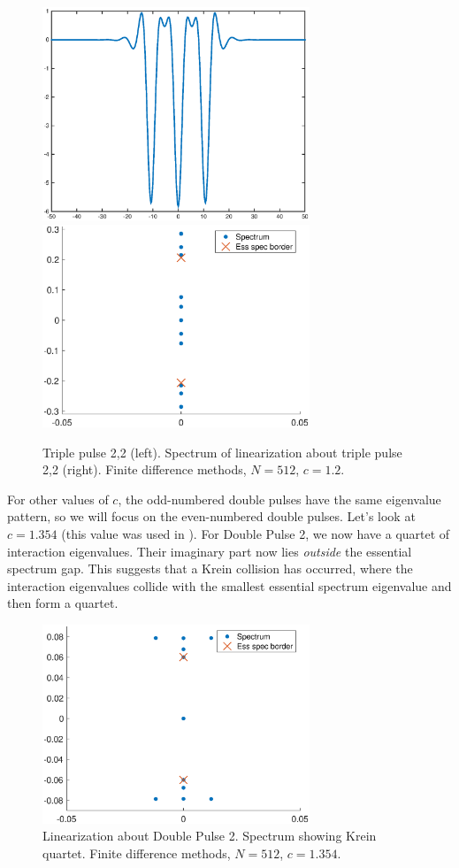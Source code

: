 \documentclass[12pt]{article}
\begin{document}
\begin{figure}[H]
\centering
\includegraphics[width=8cm]{triple12_2.eps}
\includegraphics[width=8cm]{spec12_triple2.eps}
\caption{Triple pulse 2,2 (left). Spectrum of linearization about triple pulse 2,2 (right). Finite difference methods, $N = 512$, $c = 1.2$.}
\end{figure}

For other values of $c$, the odd-numbered double pulses have the same eigenvalue pattern, so we will focus on the even-numbered double pulses. Let's look at $c = 1.354$ (this value was used in \cite{Chen1997}). For Double Pulse 2, we now have a quartet of interaction eigenvalues. Their imaginary part now lies \emph{outside} the essential spectrum gap. This suggests that a Krein collision has occurred, where the interaction eigenvalues collide with the smallest essential spectrum eigenvalue and then form a quartet.

\begin{figure}[H]
\centering
\includegraphics[width=8cm]{spec1354_double2.eps}
\caption{Linearization about Double Pulse 2. Spectrum showing Krein quartet. Finite difference methods, $N = 512$, $c = 1.354$.}
\end{figure}
\end{document}
